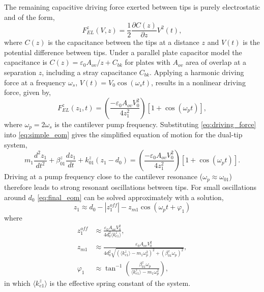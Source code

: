 \documentclass{article}
\begin{document}
The remaining capacitive driving force exerted between tips is purely electrostatic and of the form,
\begin{equation} F_{EL}^z(V,z) = \frac{1}{2} \frac{\partial C(z)}{\partial z} V^2(t), \end{equation}
where $C(z)$ is the capacitance between the tips at a distance $z$ and $V(t)$ is the potential difference between tips. Under a parallel plate capacitor model the capacitance is $C(z) = {\varepsilon_0 A_{ov}}/{z} + C_{bk}$ for plates with $A_{ov}$ area of overlap at a separation $z$, including a stray capacitance $C_{bk}$. Applying a harmonic driving force at a frequency $\omega_s$, $V(t)=V_0 \cos(\omega_s t)$, results in a nonlinear driving force, given by,
\begin{equation}
F_{EL}^z(z_1,t) = \left(\frac{-\varepsilon_0 A_{ov} V_0^2}{4z_1^2}\right)\left[1+\cos(\omega_pt)\right],
\label{eq:driving_force}
\end{equation}
where $\omega_p = 2\omega_s$ is the cantilever pump frequency.%
Substituting \eqref{eq:driving_force} into \eqref{eq:simple_eom} gives the simplified equation of motion for the dual-tip system,
\begin{equation}
m_1 \frac{d^2z_1}{dt^2} + \beta_{01}^z \frac{dz_1}{dt} + k_{01}^z (z_1-d_0) = \left( \frac{-\varepsilon_0 A_{ov} V_0^2}{4z_1^2}\right)\left[1+\cos(\omega_pt)\right].
\label{eq:final_eom}
\end{equation}
Driving at a pump frequency close to the cantilever resonance ($\omega_p \approx \omega_{01}$) therefore leads to strong resonant oscillations between tips. For small oscillations around $d_0$ \eqref{eq:final_eom} can be solved approximately with a solution,
\begin{equation}
z_1 \approx d_0 - \left|z_{1}^{off}\right| - z_{m1}\cos(\omega_pt+\varphi_1)
\label{eq:tip_oscillation}
\end{equation}
where
\begin{subequations}
\begin{align}
z_1^{off} &\approx %
\frac{ \varepsilon_0 A_{ov} V_0^2 }{ 4d_0^2 \langle k_{e1}^z \rangle }, \label{eq:tip_amp}\\
%
z_{m1} &\approx %
\frac{ \varepsilon_0 A_{ov} V_0^2 }%
{ 4d_0^2 \sqrt{ (\langle k_{e1}^z \rangle - m_1\omega_p^2)^2 + (\beta_{01}^z\omega_p)^2  } }, \\
%
\varphi_1 &\approx \tan^{-1}\left(\frac{\beta_{01}^{z}\omega_{p}}{\langle k_{e1}^{z} \rangle -m_{1}\omega_{p}^{2}}\right), \label{eq:tip_phase}
\end{align}
\end{subequations}
in which $\langle k_{e1}^z \rangle$ is the effective spring constant of the system.
\end{document}
